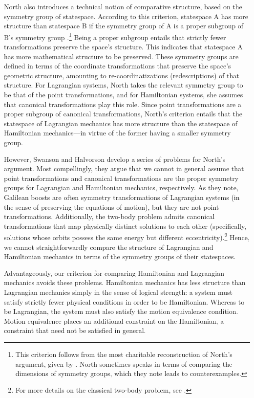 \documentclass[12pt, twoside]{article}
\begin{document}
North also introduces a technical notion of comparative structure, based on the symmetry group of statespace. According to this criterion, statespace A has more structure than statespace B if the symmetry group of A is a proper subgroup of B's symmetry group \parencites[87-88]{North}.\footnote{This criterion follows from the most charitable reconstruction of North's argument, given by \textcites[]{Swanson}. North sometimes speaks in terms of comparing the dimensions of symmetry groups, which they note leads to counterexamples.} Being a proper subgroup entails that strictly fewer transformations preserve the space's structure. This indicates that statespace A has more mathematical structure to be preserved. These symmetry groups are defined in terms of the coordinate transformations that preserve the space's geometric structure, amounting to re-coordinatizations (redescriptions) of that structure. For Lagrangian systems, North takes the relevant symmetry group to be that of the point transformations, and for Hamiltonian systems, she assumes that canonical transformations play this role. Since point transformations are a proper subgroup of canonical transformations, North's criterion entails that the statespace of Lagrangian mechanics has more structure than the statespace of Hamiltonian mechanics---in virtue of the former having a smaller symmetry group. 

However, Swanson and Halvorson \parencites*[]{Swanson} develop a series of problems for North's argument. Most compellingly, they argue that we cannot in general assume that point transformations and canonical transformations are the proper symmetry groups for Lagrangian and Hamiltonian mechanics, respectively. As they note, Galilean boosts are often symmetry transformations of Lagrangian systems (in the sense of preserving the equations of motion), but they are not point transformations. Additionally, the two-body problem admits canonical transformations that map physically distinct solutions to each other (specifically, solutions whose orbits possess the same energy but different eccentricity).\footnote{For more details on the classical two-body problem, see \textcites[]{Belot}.} Hence, we cannot straightforwardly compare the structure of Lagrangian and Hamiltonian mechanics in terms of the symmetry groups of their statespaces. 

Advantageously, our criterion for comparing Hamiltonian and Lagrangian mechanics avoids these problems. Hamiltonian mechanics has less structure than Lagrangian mechanics simply in the sense of logical strength: a system must satisfy strictly fewer physical conditions in order to be Hamiltonian. Whereas to be Lagrangian, the system must also satisfy the motion equivalence condition. Motion equivalence places an additional constraint on the Hamiltonian, a constraint that need not be satisfied in general. 
\end{document}
